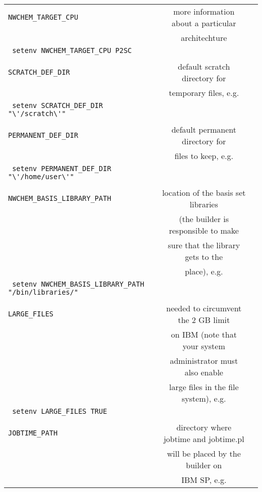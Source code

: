 \begin{table}[htbp]
\begin{center}
\begin{tabular}{lcc}
   \verb+NWCHEM_TARGET_CPU+         & more information about a particular\\
                              & architechture\\
   \verb+ setenv NWCHEM_TARGET_CPU P2SC+\\
\\
   \verb+SCRATCH_DEF_DIR+           & default scratch directory for\\
                              & temporary files, e.g.\\
   \verb+ setenv SCRATCH_DEF_DIR "\'/scratch\'"+\\
 \\
   \verb+PERMANENT_DEF_DIR+         & default permanent directory for\\
                              & files to keep, e.g.\\
   \verb+ setenv PERMANENT_DEF_DIR "\'/home/user\'"+\\
 \\
   \verb+NWCHEM_BASIS_LIBRARY_PATH+ & location of the basis set libraries \\
                              & (the builder is responsible to make \\
                              & sure that the library gets to the \\
                              & place), e.g.\\
   \verb+ setenv NWCHEM_BASIS_LIBRARY_PATH "/bin/libraries/"+\\
 \\
   \verb+LARGE_FILES+               & needed to circumvent the 2 GB limit\\
                              & on IBM (note that your system \\
                              & administrator must also enable \\
                              & large files in the file system), e.g.\\
   \verb+ setenv LARGE_FILES TRUE+\\
 \\
   \verb+JOBTIME_PATH+              & directory where jobtime and jobtime.pl\\
                              & will be placed by the builder on \\
                              & IBM SP, e.g.\\

\end{tabular}
\end{center}
\end{table}
